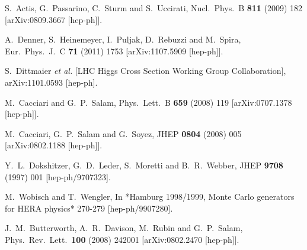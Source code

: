 \documentclass[preprintnumbers,superscriptaddress,nofootinbib,aps,prd,floatfix]{revtex4}
\begin{document}
\begin{thebibliography}{99}
  S.~Actis, G.~Passarino, C.~Sturm and S.~Uccirati,
  Nucl.\ Phys.\ B {\bf 811} (2009) 182
  [arXiv:0809.3667 [hep-ph]].
  
  A.~Denner, S.~Heinemeyer, I.~Puljak, D.~Rebuzzi and M.~Spira,
  Eur.\ Phys.\ J.\ C {\bf 71} (2011) 1753
  [arXiv:1107.5909 [hep-ph]].
  
  S.~Dittmaier {\it et al.}  [LHC Higgs Cross Section Working Group Collaboration],
  arXiv:1101.0593 [hep-ph].

  M.~Cacciari and G.~P.~Salam,
  Phys.\ Lett.\ B {\bf 659} (2008) 119
  [arXiv:0707.1378 [hep-ph]].

  M.~Cacciari, G.~P.~Salam and G.~Soyez,
  JHEP {\bf 0804} (2008) 005
  [arXiv:0802.1188 [hep-ph]].
  
  Y.~L.~Dokshitzer, G.~D.~Leder, S.~Moretti and B.~R.~Webber,
  JHEP {\bf 9708} (1997) 001
  [hep-ph/9707323].
  
  M.~Wobisch and T.~Wengler,
  In *Hamburg 1998/1999, Monte Carlo generators for HERA physics* 270-279
  [hep-ph/9907280].
  
  
  J.~M.~Butterworth, A.~R.~Davison, M.~Rubin and G.~P.~Salam,
  Phys.\ Rev.\ Lett.\  {\bf 100} (2008) 242001
  [arXiv:0802.2470 [hep-ph]].
        

\end{thebibliography}
\end{document}
